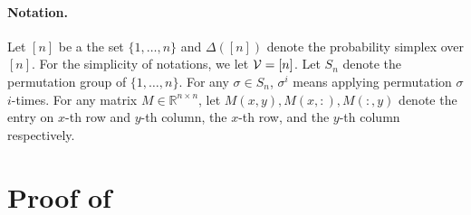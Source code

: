 \paragraph{Notation. } Let $[n]$ be a the set $\{1,\dots,n\}$ and $\Delta([n])$ denote the probability simplex over $[n]$. For the simplicity of notations, we let $\mathcal{V} = [n]$. Let $S_n$ denote the permutation group of $\{1,\dots,n\}$. For any $\sigma \in S_n$, $\sigma^i$ means applying permutation $\sigma$ $i$-times. For any matrix $M \in \mathbb{R}^{n\times n}$, let $M(x,y), M(x,:), M(:,y)$ denote the entry on $x$-th row and $y$-th column, the $x$-th row, and the $y$-th column respectively. 

\section{Proof of }
\label{sec:e-proof}
